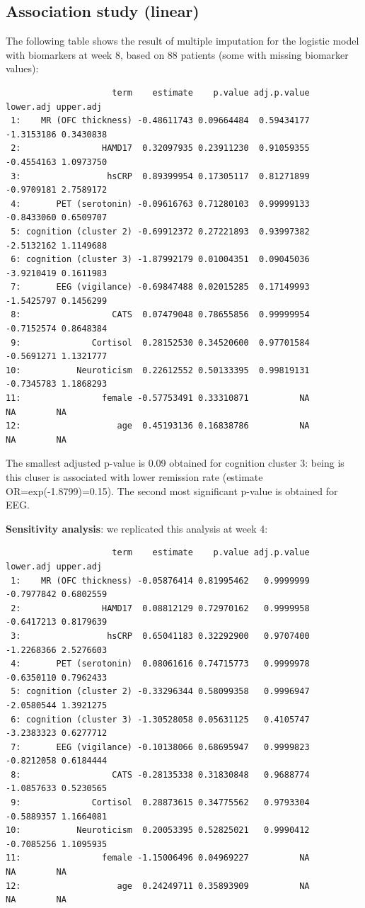 \documentclass[12pt]{article}
\begin{document}
\subsection{Association study (linear)}
\label{sec:org8f36ead}

The following table shows the result of multiple imputation for the
logistic model with biomarkers at week 8, based on 88 patients (some
with missing biomarker values):
\begin{verbatim}
                     term    estimate    p.value adj.p.value  lower.adj upper.adj
 1:    MR (OFC thickness) -0.48611743 0.09664484  0.59434177 -1.3153186 0.3430838
 2:                HAMD17  0.32097935 0.23911230  0.91059355 -0.4554163 1.0973750
 3:                 hsCRP  0.89399954 0.17305117  0.81271899 -0.9709181 2.7589172
 4:       PET (serotonin) -0.09616763 0.71280103  0.99999133 -0.8433060 0.6509707
 5: cognition (cluster 2) -0.69912372 0.27221893  0.93997382 -2.5132162 1.1149688
 6: cognition (cluster 3) -1.87992179 0.01004351  0.09045036 -3.9210419 0.1611983
 7:       EEG (vigilance) -0.69847488 0.02015285  0.17149993 -1.5425797 0.1456299
 8:                  CATS  0.07479048 0.78655856  0.99999954 -0.7152574 0.8648384
 9:              Cortisol  0.28152530 0.34520600  0.97701584 -0.5691271 1.1321777
10:           Neuroticism  0.22612552 0.50133395  0.99819131 -0.7345783 1.1868293
11:                female -0.57753491 0.33310871          NA         NA        NA
12:                   age  0.45193136 0.16838786          NA         NA        NA
\end{verbatim}

The smallest adjusted p-value is 0.09 obtained for cognition cluster
3: being is this cluser is associated with lower remission rate
(estimate OR=exp(-1.8799)=0.15). The second most significant p-value is obtained for EEG.


\clearpage

\textbf{Sensitivity analysis}: we replicated this analysis at week 4:
\begin{verbatim}
                     term    estimate    p.value adj.p.value  lower.adj upper.adj
 1:    MR (OFC thickness) -0.05876414 0.81995462   0.9999999 -0.7977842 0.6802559
 2:                HAMD17  0.08812129 0.72970162   0.9999958 -0.6417213 0.8179639
 3:                 hsCRP  0.65041183 0.32292900   0.9707400 -1.2268366 2.5276603
 4:       PET (serotonin)  0.08061616 0.74715773   0.9999978 -0.6350110 0.7962433
 5: cognition (cluster 2) -0.33296344 0.58099358   0.9996947 -2.0580544 1.3921275
 6: cognition (cluster 3) -1.30528058 0.05631125   0.4105747 -3.2383323 0.6277712
 7:       EEG (vigilance) -0.10138066 0.68695947   0.9999823 -0.8212058 0.6184444
 8:                  CATS -0.28135338 0.31830848   0.9688774 -1.0857633 0.5230565
 9:              Cortisol  0.28873615 0.34775562   0.9793304 -0.5889357 1.1664081
10:           Neuroticism  0.20053395 0.52825021   0.9990412 -0.7085256 1.1095935
11:                female -1.15006496 0.04969227          NA         NA        NA
12:                   age  0.24249711 0.35893909          NA         NA        NA
\end{verbatim}
\end{document}

